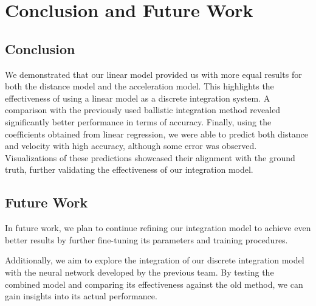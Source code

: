 \section{Conclusion and Future Work}

\subsection{Conclusion}
We demonstrated that our linear model provided us with more equal results for both the distance model and 
the acceleration model.
This highlights the effectiveness of using a linear model as a discrete integration system.
A comparison with the previously used ballistic integration method revealed significantly better performance in terms of accuracy.
Finally, using the coefficients obtained from linear regression, 
we were able to predict both distance and velocity with high accuracy, although some error was observed. 
Visualizations of these predictions showcased their alignment with the ground truth, further validating the effectiveness of our integration model.

\subsection{Future Work}
In future work, we plan to continue refining our integration model to achieve even better results by further fine-tuning its parameters and training procedures. 

Additionally, we aim to explore the integration of our discrete integration model with the neural network developed by the previous team.
By testing the combined model and comparing its effectiveness against the old method, we can gain insights into its actual performance. 
